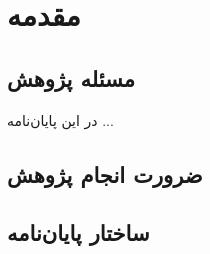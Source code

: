 \chapter{مقدمه}

\section{مسئله پژوهش}
در این پایان‌نامه  ...
\section{ضرورت انجام پژوهش}
\section{ساختار پایان‌نامه}

